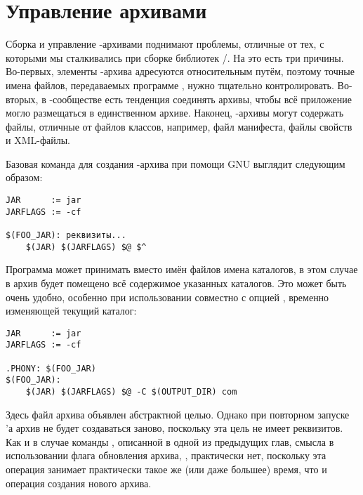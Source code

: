 \section{Управление архивами \Java{}}

Сборка и управление \Java{}\hyp{}архивами поднимают проблемы, отличные
от тех, с которыми мы сталкивались при сборке библиотек
\Clang{}/\Cplusplus{}. На это есть три причины. Во\hyp{}первых,
элементы \Java{}\hyp{}архива адресуются относительным путём, поэтому
точные имена файлов, передаваемых программе , нужно
тщательно контролировать. Во\hyp{}вторых, в \Java{}\hyp{}сообществе
есть тенденция соединять архивы, чтобы всё приложение могло
размещаться в единственном архиве. Наконец, \Java{}\hyp{}архивы могут
содержать файлы, отличные от файлов классов, например, файл манифеста,
файлы свойств и XML\hyp{}файлы.

Базовая команда для создания \Java{}\hyp{}архива при помощи GNU
\GNUmake{} выглядит следующим образом:

{\footnotesize
\begin{verbatim}
JAR      := jar
JARFLAGS := -cf

$(FOO_JAR): реквизиты...
    $(JAR) $(JARFLAGS) $@ $^
\end{verbatim}
}

Программа  может принимать вместо имён файлов имена
каталогов, в этом случае в архив будет помещено всё содержимое
указанных каталогов. Это может быть очень удобно, особенно при
использовании совместно с опцией , временно изменяющей
текущий каталог:

{\footnotesize
\begin{verbatim}
JAR      := jar
JARFLAGS := -cf

.PHONY: $(FOO_JAR)
$(FOO_JAR):
    $(JAR) $(JARFLAGS) $@ -C $(OUTPUT_DIR) com
\end{verbatim}
}

Здесь файл архива объявлен абстрактной целью. Однако при повторном
запуске \Makefile{}'а архив не будет создаваться заново, поскольку эта
цель не имеет реквизитов. Как и в случае команды ,
описанной в одной из предыдущих глав, смысла в использовании флага
обновления архива, , практически нет, поскольку эта
операция занимает практически такое же (или даже большее) время, что и
операция создания нового архива.

